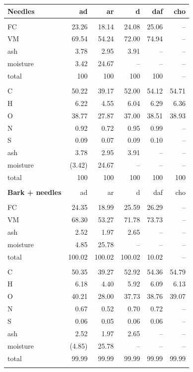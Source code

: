 \documentclass[12pt,titlepage]{article}
\begin{document}
\begin{longtable}{lrrrrr}
    \textbf{Needles} & ad & ar & d & daf & cho \\
    \hline \\
    FC       & 23.26  & 18.14  & 24.08  & 25.06  & -- \\
    VM       & 69.54  & 54.24  & 72.00  & 74.94  & -- \\
    ash      & 3.78   & 2.95   & 3.91   & --     & -- \\
    moisture & 3.42   & 24.67  & --     & --     & -- \\
    total    & 100    & 100    & 100    & 100    & -- \\
    \\
    C        & 50.22  & 39.17  & 52.00  & 54.12  & 54.71 \\
    H        & 6.22   & 4.55   & 6.04   & 6.29   & 6.36 \\
    O        & 38.77  & 27.87  & 37.00  & 38.51  & 38.93 \\
    N        & 0.92   & 0.72   & 0.95   & 0.99   & -- \\
    S        & 0.09   & 0.07   & 0.09   & 0.10   & -- \\
    ash      & 3.78   & 2.95   & 3.91   & --     & -- \\
    moisture & (3.42) & 24.67  & --     & --     & -- \\
    total    & 100    & 100    & 100    & 100    & 100 \\
    \\

    \textbf{Bark + needles} & ad & ar & d & daf & cho \\
    \hline \\
    FC       & 24.35  & 18.99  & 25.59  & 26.29  & -- \\
    VM       & 68.30  & 53.27  & 71.78  & 73.73  & -- \\
    ash      & 2.52   & 1.97   & 2.65   & --     & -- \\
    moisture & 4.85   & 25.78  & --     & --     & -- \\
    total    & 100.02 & 100.02 & 100.02 & 10.02  & -- \\
    \\
    C        & 50.35  & 39.27  & 52.92  & 54.36  & 54.79 \\
    H        & 6.18   & 4.40   & 5.92   & 6.09   & 6.13 \\
    O        & 40.21  & 28.00  & 37.73  & 38.76  & 39.07 \\
    N        & 0.67   & 0.52   & 0.70   & 0.72   & -- \\
    S        & 0.06   & 0.05   & 0.06   & 0.06   & -- \\
    ash      & 2.52   & 1.97   & 2.65   & --     & -- \\
    moisture & (4.85) & 25.78  & --     & --     & -- \\
    total    & 99.99  & 99.99  & 99.99  & 99.99  & 99.99 \\
    \\


\end{longtable}
\end{document}
